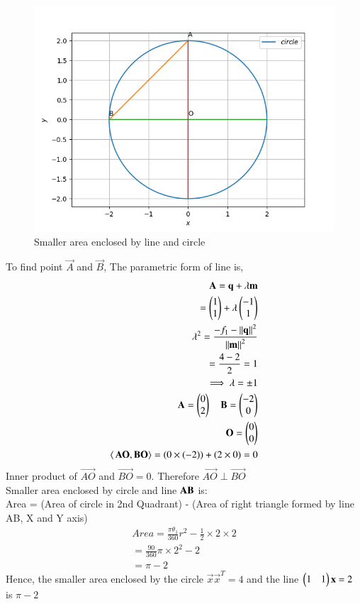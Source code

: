 \documentclass[journal,12pt,twocolumn]{IEEEtran}
\begin{document}
\begin{figure}[h!]
	\centering
	\includegraphics[width=\columnwidth]{circle.png}
	\caption{Smaller area enclosed by line and circle}
	\label{eq:myfig}
\end{figure}

To find point $\vec{A}$ and $\vec{B}$,
The parametric form of line is,
\begin{align}
    \mathbf{A} = \mathbf{q}+\lambda\mathbf{m}\label{eq9}\\
            = \begin{pmatrix}1\\1\end{pmatrix}+\lambda\begin{pmatrix}-1\\1\end{pmatrix}\label{eq10}\\
    \lambda^2 = \frac{-f_1-\left\lVert\mathbf{q}\right\rVert^2}{\left\lVert\mathbf{m}\right\rVert^2}\label{eq11}\\
                = \frac{4-2}{2} = 1\label{eq12}\\
    \implies \lambda = \pm{1} \label{eq13}\\
    \mathbf{A} = \begin{pmatrix}0\\2\end{pmatrix}\quad \mathbf{B} = \begin{pmatrix}-2\\0\end{pmatrix}\label{eq14}\\
 \mathbf{O} = \begin{pmatrix}0\\0\end{pmatrix} \\
 \langle\,\mathbf {AO},\mathbf{BO}\rangle=(0\times(-2))+(2\times0)=0
\end{align}
Inner product of $\vec{AO}$ and $\vec{BO}=0$. Therefore $\vec{AO} \perp \vec{BO}$ \\
Smaller area enclosed by circle and line $\bf{AB}$ is:\\
 Area = (Area of circle in 2nd Quadrant) - (Area of right triangle formed by line AB, X and Y axis)
 \begin{align}
Area=\frac{\pi\theta_1}{360}r^2-\frac{1}{2}\times2\times2\label{eq15}\\
=\frac{90}{360}\pi\times2^2-2\label{eq16}\\
=\pi-2\label{eq17}
\end{align}
Hence, the smaller area enclosed by the circle  $\vec{x}\vec{x}^T=4$ and the line $\begin{pmatrix}1 & 1\end{pmatrix} \mathbf{x}=2$ is $\pi-2$
\end{document}
